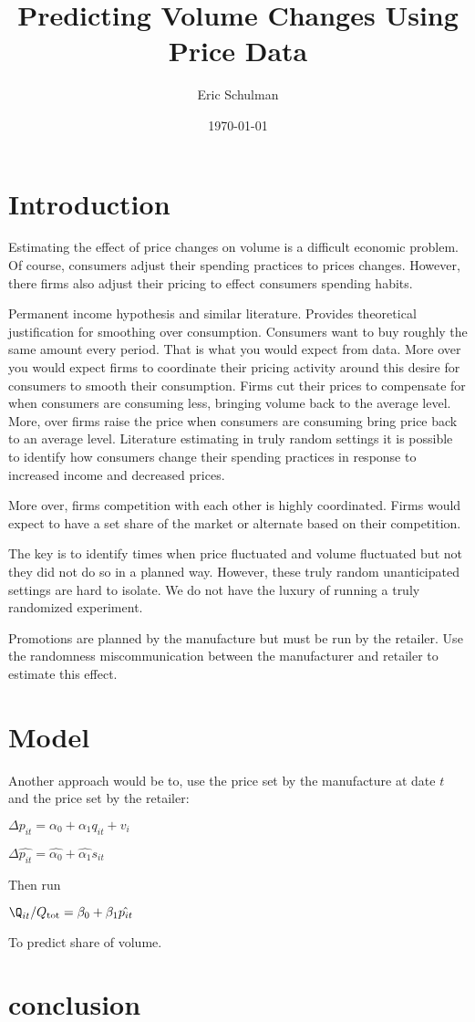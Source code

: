 \documentclass{article}
\title{Predicting Volume Changes Using Price Data}
\author{Eric Schulman}
\date{\today}
\begin{document}
\maketitle

\section{Introduction}

Estimating the effect of price changes on volume is a difficult economic problem. Of course, consumers adjust their spending practices to prices changes.  However, there firms also adjust their pricing to effect consumers spending habits.

Permanent income hypothesis and similar literature. Provides theoretical justification for smoothing over consumption. Consumers want to buy roughly the same amount every period. That is what you would expect from data.
More over you would expect firms to coordinate their pricing activity around this desire for consumers to smooth their consumption.
Firms cut their prices to compensate for when consumers are consuming less, bringing volume back to the average level. More, over firms raise the price when consumers are consuming bring price back to an average level.
Literature estimating in truly random settings it is possible to identify how consumers change their spending practices in response to increased income and decreased prices.

More over, firms competition with each other is highly coordinated. Firms would expect to have a set share of the market or alternate based on their competition.


The key is to identify times when price fluctuated and volume fluctuated but not they did not do so in a planned way.
However, these truly random unanticipated settings are hard to isolate. We do not have the luxury of running a truly randomized experiment.

Promotions are planned by the manufacture but must be run by the retailer. Use the randomness miscommunication between the manufacturer and retailer to estimate this effect.

\section{Model}

Another approach would be to, use the price set by the manufacture at date $t$ and the price set by the retailer:

$\Delta p_{it} = \alpha_0 + \alpha_1 q_{it} + v_i$

$\Delta \hat{p_{it}} = \hat{\alpha_0} + \hat{\alpha_1} s_{it} $

Then run 

$\Q_{it}/Q_{\text{tot}} = \beta_0 + \beta_1 \hat{p_{it}}$

To predict share of volume.





\section{conclusion}
\end{document}
